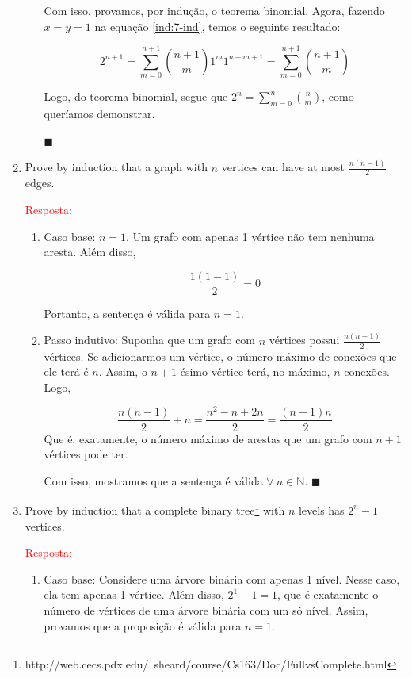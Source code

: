 \documentclass{article}
\newcommand*{\QEDA}{\hfill\ensuremath{\blacksquare}}%
\begin{document}
\begin{enumerate}
\begin{enumerate}[itemsep=0pt, label=(\roman*)]
    Com isso, provamos, por indução, o teorema binomial. Agora, fazendo $x=y=1$ na equação \ref{ind:7-ind}, temos o seguinte resultado: 
    
    \begin{equation*}
        2^{n+1} = \sum_{m=0}^{n+1} {n+1 \choose m} 1^{m}1^{n-m+1} = \sum_{m=0}^{n+1} {n+1 \choose m}
    \end{equation*}
    
    Logo, do teorema binomial, segue que $ 2^{n} = \sum_{m=0}^{n} {n \choose m}$, como queríamos demonstrar.
    
    \QEDA
    \end{enumerate}
  
  
  \item Prove by induction that a graph with $n$ vertices can have at most  $\frac{n(n-1)}{2}$ edges.
  
    \textcolor{red}{Resposta: }
    \begin{enumerate}[itemsep=0pt, label=(\roman*)]
    
    \item Caso base: $n=1$. Um grafo com apenas 1 vértice não tem nenhuma aresta. Além disso, 
    
    $$
    \frac{1(1-1)}{2} = 0
    $$
    
    Portanto, a sentença é válida para $n=1$. 
    
    \item Passo indutivo: Suponha que um grafo com $n$ vértices possui $\frac{n(n-1)}{2}$ vértices. Se adicionarmos um vértice, o número máximo de conexões que ele terá é $n$. Assim, o $n+1$-ésimo vértice terá, no máximo, $n$ conexões. Logo, 
    
    $$
    \frac{n(n-1)}{2}+n = \frac{n^2-n+2n}{2} = \frac{(n+1)n}{2}
    $$
    Que é, exatamente, o número máximo de arestas que um grafo com $n+1$ vértices pode ter. 
    
    Com isso, mostramos que a sentença é válida $\forall~n \in \mathbb{N}$. \QEDA
    \end{enumerate}
  
  
  \item Prove by induction that a complete binary tree\footnote{http://web.cecs.pdx.edu/~sheard/course/Cs163/Doc/FullvsComplete.html} with $n$ levels has $2^n-1$ vertices.
  
    \textcolor{red}{Resposta: }
    \begin{enumerate}[itemsep=0pt, label=(\roman*)]
    
    \item Caso base: Considere uma árvore binária com apenas 1 nível. Nesse caso, ela tem apenas 1 vértice. Além disso, $2^1-1=1$, que é exatamente o número de vértices de uma árvore binária com um só nível. Assim, provamos que a proposição é válida para $n=1$. 
    

\end{enumerate}
\end{enumerate}
\end{document}
